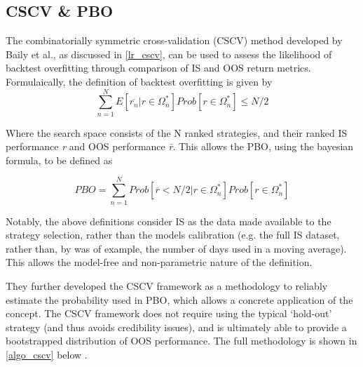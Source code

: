 \documentclass[a4paper,latin]{paper}
\begin{document}
\subsection{CSCV \& PBO}\label{imp_cscv}

The  combinatorially symmetric cross-validation (CSCV) method developed by Baily et al., as discussed in \ref{lr_cscv}, can be used to assess the likelihood of backtest overfitting through comparison of IS and OOS return metrics. Formulaically, the definition of backtest overfitting is given by
\begin{equation}\label{eq:PBO1}
\sum_{n=1}^{N}E[\overline{r_n}|r\in 
\Omega_{n}^{*}]Prob[r\in\Omega_{n}^{*}]\leq{N/2}
\end{equation}

Where the search space {\textOmega} consists of the N ranked strategies, and their ranked IS performance \textit{r} and OOS performance
\textit{\={r}}. This allows the PBO, using the bayesian formula, to be defined as 

\begin{equation}\label{eq:PBO2}
PBO = \sum_{n=1}^{N}Prob[\overline{r} < {N/2}|r\in\Omega_{n}^{*}]Prob[r\in\Omega_{n}^{*}]
\end{equation}

Notably, the above definitions consider IS as the data made available to the strategy selection, rather than the 
models calibration (e.g. the full IS dataset, rather than, by was of example, the number of days used in a moving average). 
This allows the model-free and non-parametric nature of the definition. 
\hfill \break 

They further developed the CSCV framework as a methodology to reliably estimate the probability used in PBO, which allows a concrete application of the concept. The CSCV framework does not require using the typical ‘hold-out’ strategy (and thus avoids credibility issues), and is ultimately able to provide a bootstrapped distribution of OOS performance. The full methodology is shown in \ref{algo_cscv} below \cite{BailyPBO}.
\hfill \break 
\end{document}

